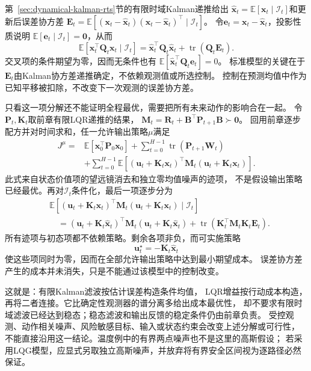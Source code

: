 第~\ref{sec:dynamical-kalman-rts}节的有限时域Kalman递推给出
$\widehat{\bm x}_t=\mathbb E[\bm x_t\mid\mathcal I_t]$和更新后误差协方差
$\bm E_t=\mathbb E[(\bm x_t-\widehat{\bm x}_t)
(\bm x_t-\widehat{\bm x}_t)^\top\mid\mathcal I_t]$。
令$\bm e_t=\bm x_t-\widehat{\bm x}_t$，投影性质说明
$\mathbb E[\bm e_t\mid\mathcal I_t]=\bm0$，从而
\[
  \mathbb E[\bm x_t^\top\bm Q_t\bm x_t\mid\mathcal I_t]
  =\widehat{\bm x}_t^\top\bm Q_t\widehat{\bm x}_t
    +\operatorname{tr}(\bm Q_t\bm E_t).
\]
交叉项的条件期望为零，因而无条件也有
$\mathbb E[\widehat{\bm x}_t^\top\bm Q_t\bm e_t]=0$。
标准模型的关键在于$\bm E_t$由Kalman协方差递推确定，不依赖观测值或所选控制。
控制在预测均值中作为已知平移被扣除，不改变下一次观测的误差协方差。

只看这一项分解还不能证明全程最优，需要把所有未来动作的影响合在一起。
令$\bm P_t,\bm K_t$取前章有限LQR递推的结果，
$\bm M_t=\bm R_t+\bm B^\top\bm P_{t+1}\bm B\succ\bm0$。
回用前章逐步配方并对时间求和，任一允许输出策略$\mu$满足
\begin{align*}
  J^\mu={}&
    \mathbb E[\bm x_0^\top\bm P_0\bm x_0]
    +\sum_{t=0}^{H-1}\operatorname{tr}(\bm P_{t+1}\bm W_t)\\
    &+\sum_{t=0}^{H-1}\mathbb E[
      (\bm u_t+\bm K_t\bm x_t)^\top
      \bm M_t(\bm u_t+\bm K_t\bm x_t)].
\end{align*}
此式来自状态价值项的望远镜消去和独立零均值噪声的迹项，
不是假设输出策略已经最优。再对$\mathcal I_t$条件化，最后一项逐步分为
\begin{align*}
  &\mathbb E[
    (\bm u_t+\bm K_t\bm x_t)^\top\bm M_t
    (\bm u_t+\bm K_t\bm x_t)\mid\mathcal I_t]\\
  &\quad=
    (\bm u_t+\bm K_t\widehat{\bm x}_t)^\top\bm M_t
    (\bm u_t+\bm K_t\widehat{\bm x}_t)
    +\operatorname{tr}(\bm K_t^\top\bm M_t\bm K_t\bm E_t).
\end{align*}
所有迹项与初态项都不依赖策略。剩余各项非负，而可实施策略
\begin{equation}
  \bm u_t^\star=-\bm K_t\widehat{\bm x}_t
  \label{eq:policy-finite-lqg-feedback}
\end{equation}
使这些项同时为零，因而在全部允许输出策略中达到最小期望成本。
误差协方差产生的成本并未消失，只是不能通过该模型中的控制改变。

这就是：有限Kalman滤波按估计误差构造条件均值，
LQR增益按行动成本构造，再将二者连接。它比确定性观测器的谱分离多给出成本最优性，
却不要求有限时域滤波已经达到稳态；稳态滤波和输出反馈的稳定条件仍由前章负责。
受控观测、动作相关噪声、风险敏感目标、输入或状态约束会改变上述分解或可行性，
不能直接沿用这一结论。温度例中的有界两点噪声也不是这里的高斯假设；
若采用LQG模型，应显式另取独立高斯噪声，并放弃将有界安全区间视为逐路径必然保证。

